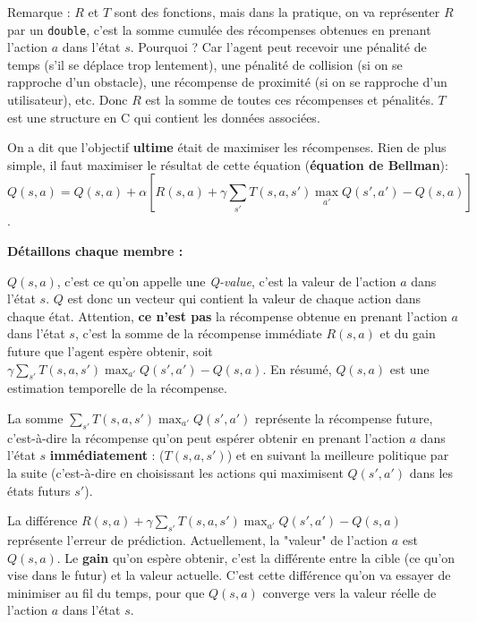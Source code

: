 \documentclass{article}
\begin{document}
Remarque : $R$ et $T$ sont des fonctions, mais dans la pratique, on va représenter $R$ par un \texttt{double}, c'est la somme cumulée des récompenses obtenues en prenant l'action $a$ dans l'état $s$.
Pourquoi ? Car l'agent peut recevoir une pénalité de temps (s'il se déplace trop lentement), une pénalité de collision (si on se rapproche d'un obstacle),
 une récompense de proximité (si on se rapproche d'un utilisateur), etc. 
 Donc $R$ est la somme de toutes ces récompenses et pénalités.
$T$ est une structure en C qui contient les données associées.

\vspace{0.5cm}

On a dit que l'objectif \textbf{ultime} était de maximiser les récompenses.
Rien de plus simple, il faut maximiser le résultat de cette équation (\textbf{équation de Bellman}):
$$Q(s, a) = Q(s, a) + \alpha \left[R(s, a) + \gamma \sum_{s'} T(s, a, s') \max_{a'} Q(s', a') - Q(s, a)\right]$$.

\vspace{0.5cm}

\textbf{Détaillons chaque membre :}

$Q(s, a)$, c'est ce qu'on appelle une \textit{Q-value}, c'est la valeur de l'action $a$ dans l'état $s$. 
$Q$ est donc un vecteur qui contient la valeur de chaque action dans chaque état.
Attention, \textbf{ce n'est pas} la récompense obtenue en prenant l'action $a$ dans l'état $s$,
c'est la somme de la récompense immédiate $R(s, a)$ et du gain future que l'agent espère obtenir, soit
 $\gamma \sum_{s'} T(s, a, s') \max_{a'} Q(s', a') - Q(s, a)$.
En résumé, $Q(s, a)$ est une estimation temporelle de la récompense.

\vspace{0.5cm}

La somme $\sum_{s'} T(s, a, s') \max_{a'} Q(s', a')$ représente la récompense future, 
c'est-à-dire la récompense qu'on peut espérer obtenir en prenant l'action $a$ dans l'état $s$ \textbf{immédiatement} :
($T(s, a, s')$) et en suivant la meilleure politique par la suite 
(c'est-à-dire en choisissant les actions qui maximisent $Q(s', a')$ dans les états futurs $s'$).

\vspace{0.5cm}

La différence $R(s, a) + \gamma \sum_{s'} T(s, a, s') \max_{a'} Q(s', a') - Q(s, a)$ représente l'erreur de prédiction.
Actuellement, la "valeur" de l'action $a$ est $Q(s, a)$. Le \textbf{gain} qu'on espère obtenir, c'est la différente entre la cible
(ce qu'on vise dans le futur) et la valeur actuelle. C'est cette différence qu'on va essayer de minimiser au fil du temps, 
pour que $Q(s, a)$ converge vers la valeur réelle de l'action $a$ dans l'état $s$.
\end{document}
